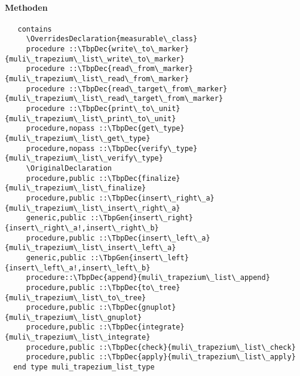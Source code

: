 \paragraph{Methoden}
\begin{Verbatim}
   contains
     \OverridesDeclaration{measurable\_class}
     procedure ::\TbpDec{write\_to\_marker}{muli\_trapezium\_list\_write\_to\_marker}
     procedure ::\TbpDec{read\_from\_marker}{muli\_trapezium\_list\_read\_from\_marker}
     procedure ::\TbpDec{read\_target\_from\_marker}{muli\_trapezium\_list\_read\_target\_from\_marker}
     procedure ::\TbpDec{print\_to\_unit}{muli\_trapezium\_list\_print\_to\_unit}
     procedure,nopass ::\TbpDec{get\_type}{muli\_trapezium\_list\_get\_type}
     procedure,nopass ::\TbpDec{verify\_type}{muli\_trapezium\_list\_verify\_type}
     \OriginalDeclaration
     procedure,public ::\TbpDec{finalize}{muli\_trapezium\_list\_finalize}
     procedure,public ::\TbpDec{insert\_right\_a}{muli\_trapezium\_list\_insert\_right\_a}
     generic,public ::\TbpGen{insert\_right}{insert\_right\_a!,insert\_right\_b}
     procedure,public ::\TbpDec{insert\_left\_a}{muli\_trapezium\_list\_insert\_left\_a}
     generic,public ::\TbpGen{insert\_left}{insert\_left\_a!,insert\_left\_b}
     procedure::\TbpDec{append}{muli\_trapezium\_list\_append}
     procedure,public ::\TbpDec{to\_tree}{muli\_trapezium\_list\_to\_tree}
     procedure,public ::\TbpDec{gnuplot}{muli\_trapezium\_list\_gnuplot}
     procedure,public ::\TbpDec{integrate}{muli\_trapezium\_list\_integrate}
     procedure,public ::\TbpDec{check}{muli\_trapezium\_list\_check}
     procedure,public ::\TbpDec{apply}{muli\_trapezium\_list\_apply}
  end type muli_trapezium_list_type
\end{Verbatim}
